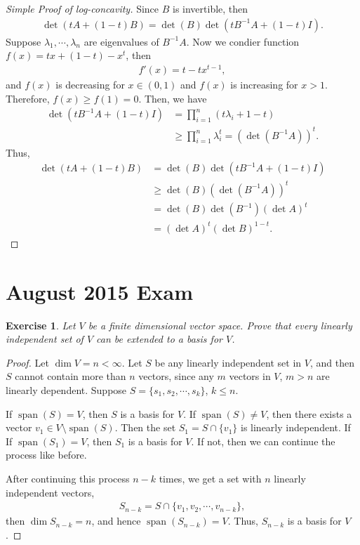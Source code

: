 \documentclass[11pt]{article}
\newtheorem{exercise}{Exercise}[section]
\theoremstyle{definition}
\numberwithin{equation}{subsection}
\begin{document}
\medskip

\begin{proof}[Simple Proof of log-concavity]
Since $B$ is invertible, then
\begin{align*}
    \det(tA + (1-t)B) = \det(B) \det\left(tB^{-1}A + (1-t)I\right).
\end{align*}
Suppose $\lambda_1, \cdots, \lambda_n$ are eigenvalues of $B^{-1}A$. Now we condier function $f(x) = tx + (1-t) - x^t$, then 
\begin{align*}
    f'(x) = t - tx^{t-1},
\end{align*}
and $f(x)$ is decreasing for $x \in (0,1)$ and $f(x)$ is increasing for $x > 1$. Therefore, $f(x) \geq f(1) = 0$. Then, we have
\begin{align*}
    \det\left(tB^{-1}A + (1-t)I\right) & = \prod^n_{i=1} (t \lambda_i + 1 - t) \\
    & \geq \prod^n_{i=1}\lambda_i^t = \left(\det(B^{-1}A)\right)^t.
\end{align*}
Thus, 
\begin{align*}
    \det(tA + (1-t)B) & = \det(B) \det\left(tB^{-1}A + (1-t)I\right)\\
    & \geq \det(B) \left(\det(B^{-1}A)\right)^t \\
    & = \det(B) \det\left(B^{-1}\right) (\det A)^t \\
    & = (\det A)^t (\det B)^{1-t}.
\end{align*}
\end{proof}


\newpage
\section{August 2015 Exam}

\begin{exercise}
Let $V$ be a finite dimensional vector space. Prove that every linearly independent set of $V$ can be extended to a basis for $V$.
\end{exercise}
\begin{proof}
Let $\dim V = n < \infty$. Let $S$ be any linearly independent set in $V$, and then $S$ cannot contain more than $n$ vectors, since any $m$ vectors in $V$, $m > n$ are linearly dependent. Suppose $S = \{s_1, s_2, \cdots, s_k \}$, $k \leq n$. 

If $\operatorname{span}(S) = V$, then $S$ is a basis for $V$.
If $\operatorname{span}(S) \neq V$, then there exists a vector $v_1 \in V \setminus \operatorname{span}(S)$. Then the set $S_1 = S \cap \{v_1\}$ is linearly independent. If If $\operatorname{span}(S_1) = V$, then $S_1$ is a basis for $V$. If not, then we can continue the process like before. 

After continuing this process $n - k$ times, we get a set with $n$ linearly independent vectors,
\begin{align*}
    S_{n - k} = S \cap \{v_1, v_2, \cdots, v_{n-k}\},
\end{align*}
then $\dim S_{n-k} = n$, and hence $\operatorname{span}(S_{n-k}) = V$. Thus, $S_{n-k}$ is a basis for $V$.
\end{proof}
\end{document}
